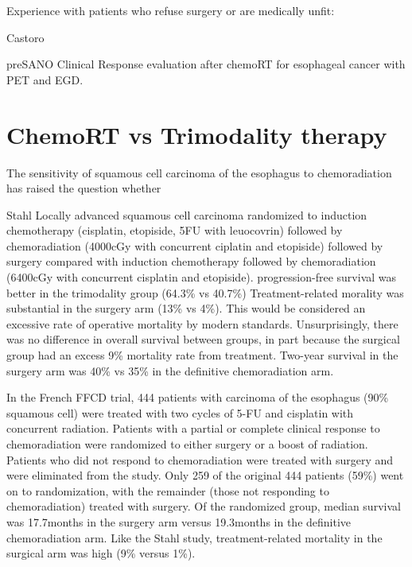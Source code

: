 \documentclass[
]{book}
\begin{document}
Experience with patients who refuse surgery or are medically unfit:

\citep{taketa300} \citep{taketa95} \citep{furlong107}

Castoro\citep{castoro1375}

preSANO\citep{chirieac1347} Clinical Response evaluation after chemoRT for esophageal cancer with PET and EGD.

\hypertarget{chemort-vs-trimodality-therapy-1}{%
\section{ChemoRT vs Trimodality therapy}\label{chemort-vs-trimodality-therapy-1}}

The sensitivity of squamous cell carcinoma of the esophagus to chemoradiation has raised the question whether

Stahl Locally advanced squamous cell carcinoma randomized to induction chemotherapy (cisplatin, etopiside, 5FU with leuocovrin) followed by chemoradiation (4000cGy with concurrent ciplatin and etopiside) followed by surgery compared with induction chemotherapy followed by chemoradiation (6400cGy with concurrent cisplatin and etopiside).\citep{stahl2310} progression-free survival was better in the trimodality group (64.3\% vs 40.7\%) Treatment-related morality was substantial in the surgery arm (13\% vs 4\%). This would be considered an excessive rate of operative mortality by modern standards. Unsurprisingly, there was no difference in overall survival between groups, in part because the surgical group had an excess 9\% mortality rate from treatment. Two-year survival in the surgery arm was 40\% vs 35\% in the definitive chemoradiation arm. \citep{stahl4530}

In the French FFCD trial, 444 patients with carcinoma of the esophagus (90\% squamous cell) were treated with two cycles of 5-FU and cisplatin with concurrent radiation.\citep{bedenne1160} Patients with a partial or complete clinical response to chemoradiation were randomized to either surgery or a boost of radiation. Patients who did not respond to chemoradiation were treated with surgery and were eliminated from the study. Only 259 of the original 444 patients (59\%) went on to randomization, with the remainder (those not responding to chemoradiation) treated with surgery. Of the randomized group, median survival was 17.7months in the surgery arm versus 19.3months in the definitive chemoradiation arm. Like the Stahl study, treatment-related mortality in the surgical arm was high (9\% versus 1\%).
\end{document}
